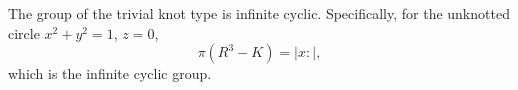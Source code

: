 The group of the trivial knot type is infinite cyclic. Specifically, for the unknotted circle $x^2 + y^2 = 1$, $z = 0$,
$$\pi(R^3 - K) = |x :|,$$
which is the infinite cyclic group.
